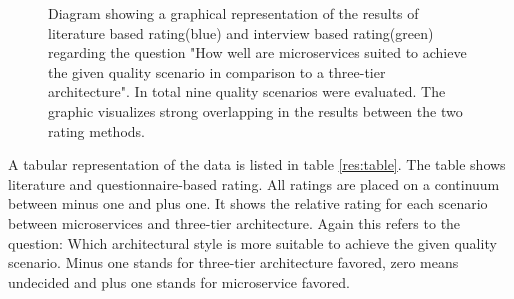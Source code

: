 \begin{figure}
\centering
{}
 \caption[KivatDiagram showing a graphical representation between literature and interview based evaluation regarding microservices and given quality scenarios]{Diagram showing a graphical representation of the results of literature based rating(blue) and interview based rating(green) regarding the question "How well are microservices suited to achieve the given quality scenario in comparison to a three-tier architecture". In total nine quality scenarios were evaluated. The graphic visualizes strong overlapping in the results between the two rating methods.}
\label{fig:kiviatQuality}
\end{figure}

A tabular representation of the data is listed in table \ref{res:table}.
The table shows literature and questionnaire-based rating.
All ratings are placed on a continuum between minus one and plus one.
It shows the relative rating for each scenario between microservices and three-tier architecture.
Again this refers to the question: Which architectural style is more suitable to achieve the given quality scenario.
Minus one stands for three-tier architecture favored, zero means undecided and plus one stands for microservice favored.


